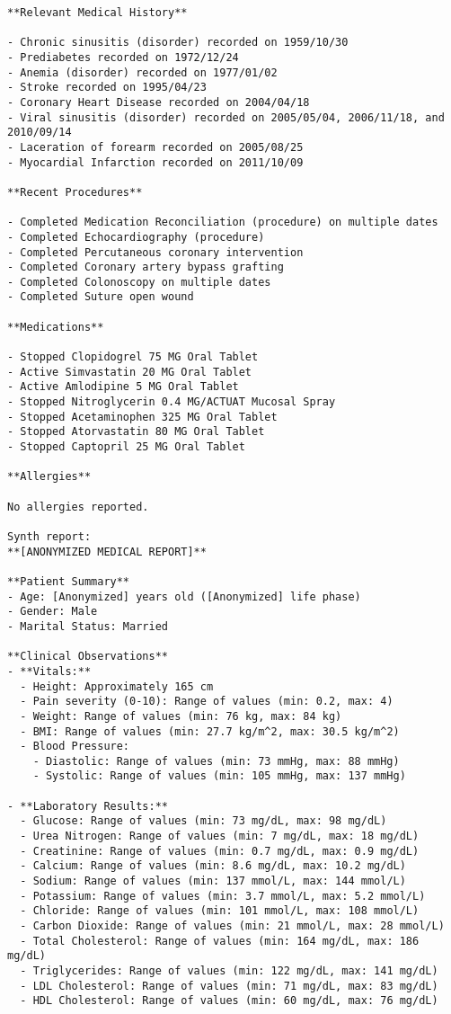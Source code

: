 \begin{lstlisting}
**Relevant Medical History**

- Chronic sinusitis (disorder) recorded on 1959/10/30
- Prediabetes recorded on 1972/12/24
- Anemia (disorder) recorded on 1977/01/02
- Stroke recorded on 1995/04/23
- Coronary Heart Disease recorded on 2004/04/18
- Viral sinusitis (disorder) recorded on 2005/05/04, 2006/11/18, and 2010/09/14
- Laceration of forearm recorded on 2005/08/25
- Myocardial Infarction recorded on 2011/10/09

**Recent Procedures**

- Completed Medication Reconciliation (procedure) on multiple dates
- Completed Echocardiography (procedure)
- Completed Percutaneous coronary intervention
- Completed Coronary artery bypass grafting
- Completed Colonoscopy on multiple dates
- Completed Suture open wound

**Medications**

- Stopped Clopidogrel 75 MG Oral Tablet
- Active Simvastatin 20 MG Oral Tablet
- Active Amlodipine 5 MG Oral Tablet
- Stopped Nitroglycerin 0.4 MG/ACTUAT Mucosal Spray
- Stopped Acetaminophen 325 MG Oral Tablet
- Stopped Atorvastatin 80 MG Oral Tablet
- Stopped Captopril 25 MG Oral Tablet

**Allergies**

No allergies reported.

Synth report:
**[ANONYMIZED MEDICAL REPORT]**

**Patient Summary**
- Age: [Anonymized] years old ([Anonymized] life phase)
- Gender: Male
- Marital Status: Married

**Clinical Observations**
- **Vitals:**
  - Height: Approximately 165 cm
  - Pain severity (0-10): Range of values (min: 0.2, max: 4)
  - Weight: Range of values (min: 76 kg, max: 84 kg)
  - BMI: Range of values (min: 27.7 kg/m^2, max: 30.5 kg/m^2)
  - Blood Pressure:
    - Diastolic: Range of values (min: 73 mmHg, max: 88 mmHg)
    - Systolic: Range of values (min: 105 mmHg, max: 137 mmHg)

- **Laboratory Results:**
  - Glucose: Range of values (min: 73 mg/dL, max: 98 mg/dL)
  - Urea Nitrogen: Range of values (min: 7 mg/dL, max: 18 mg/dL)
  - Creatinine: Range of values (min: 0.7 mg/dL, max: 0.9 mg/dL)
  - Calcium: Range of values (min: 8.6 mg/dL, max: 10.2 mg/dL)
  - Sodium: Range of values (min: 137 mmol/L, max: 144 mmol/L)
  - Potassium: Range of values (min: 3.7 mmol/L, max: 5.2 mmol/L)
  - Chloride: Range of values (min: 101 mmol/L, max: 108 mmol/L)
  - Carbon Dioxide: Range of values (min: 21 mmol/L, max: 28 mmol/L)
  - Total Cholesterol: Range of values (min: 164 mg/dL, max: 186 mg/dL)
  - Triglycerides: Range of values (min: 122 mg/dL, max: 141 mg/dL)
  - LDL Cholesterol: Range of values (min: 71 mg/dL, max: 83 mg/dL)
  - HDL Cholesterol: Range of values (min: 60 mg/dL, max: 76 mg/dL)


\end{lstlisting}
